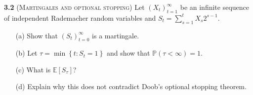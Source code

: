     
    
    
    
    
    
    
    

\noindent\textbf{3.2}
(\textsc{Martingales and optional stopping}) Let $\left(X_{t}\right)_{t=1}^{\infty}$ be an infinite sequence of independent
Rademacher random variables and $S_{t}=\sum_{s=1}^{t} X_{s} 2^{s-1}$.
\begin{enumerate}
    \item[(a)] Show that $\left(S_{t}\right)_{t=0}^{\infty}$ is a martingale.
    \item[(b)] Let $\tau=\min \left\{t: S_{t}=1\right\}$ and show that $\mathbb{P}(\tau<\infty)=1$. 
    \item[(c)] What is $\mathbb{E}\left[S_{\tau}\right]$?
    \item[(d)] Explain why this does not contradict Doob's optional stopping theorem. 
\end{enumerate}

